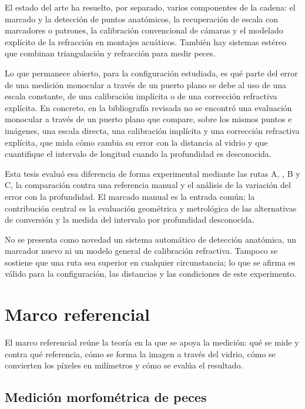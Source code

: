 El estado del arte ha resuelto, por separado, varios componentes de la cadena: el marcado y la detección de puntos anatómicos, la recuperación de escala con marcadores o patrones, la calibración convencional de cámaras y el modelado explícito de la refracción en montajes acuáticos. También hay sistemas estéreo que combinan triangulación y refracción para medir peces.

Lo que permanece abierto, para la configuración estudiada, es qué parte del error de una medición monocular a través de un puerto plano se debe al uso de una escala constante, de una calibración implícita o de una corrección refractiva explícita. En concreto, en la bibliografía revisada no se encontró una evaluación monocular a través de un puerto plano que compare, sobre los mismos puntos e imágenes, una escala directa, una calibración implícita y una corrección refractiva explícita, que mida cómo cambia su error con la distancia al vidrio y que cuantifique el intervalo de longitud cuando la profundidad es desconocida.

Esta tesis evaluó esa diferencia de forma experimental mediante las rutas A, \Aprime, B y C, la comparación contra una referencia manual y el análisis de la variación del error con la profundidad. El marcado manual es la entrada común; la contribución central es la evaluación geométrica y metrológica de las alternativas de conversión y la medida del intervalo por profundidad desconocida.

No se presenta como novedad un sistema automático de detección anatómica, un marcador nuevo ni un modelo general de calibración refractiva. Tampoco se sostiene que una ruta sea superior en cualquier circunstancia; lo que se afirma es válido para la configuración, las distancias y las condiciones de este experimento.

\section{Marco referencial}
\label{sec:referencial}

El marco referencial reúne la teoría en la que se apoya la medición: qué se mide y contra qué referencia, cómo se forma la imagen a través del vidrio, cómo se convierten los píxeles en milímetros y cómo se evalúa el resultado.

\subsection{Medición morfométrica de peces}

